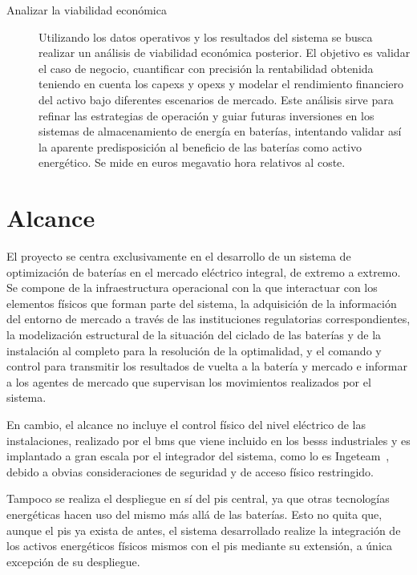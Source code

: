 \begin{description}
  \item[Analizar la viabilidad económica] Utilizando los datos operativos y los resultados del sistema se busca realizar un análisis de viabilidad económica posterior. El objetivo es validar el caso de negocio, cuantificar con precisión la rentabilidad obtenida teniendo en cuenta los \glspl{capex} y \glspl{opex} y modelar el rendimiento financiero del activo bajo diferentes escenarios de mercado. Este análisis sirve para refinar las estrategias de operación y guiar futuras inversiones en los sistemas de almacenamiento de energía en baterías, intentando validar así la aparente predisposición al beneficio de las baterías como activo energético. Se mide en euros megavatio hora relativos al coste.

\end{description}

\section{Alcance}%
\label{makereference1.2}

El proyecto se centra exclusivamente en el desarrollo de un sistema de optimización de baterías en el mercado eléctrico integral, de extremo a extremo. Se compone de la infraestructura operacional con la que interactuar con los elementos físicos que forman parte del sistema, la adquisición de la información del entorno de mercado a través de las instituciones regulatorias correspondientes, la modelización estructural de la situación del ciclado de las baterías y de la instalación al completo para la resolución de la optimalidad, y el comando y control para transmitir los resultados de vuelta a la batería y mercado e informar a los agentes de mercado que supervisan los movimientos realizados por el sistema.

En cambio, el alcance no incluye el control físico del nivel eléctrico de las instalaciones, realizado por el \gls{bms} que viene incluido en los \glspl{bess} industriales y es implantado a gran escala por el integrador del sistema, como lo es Ingeteam~\cite{ingeteam2022ingeteam}, debido a obvias consideraciones de seguridad y de acceso físico restringido.

Tampoco se realiza el despliegue en sí del \gls{pis} central, ya que otras tecnologías energéticas hacen uso del mismo más allá de las baterías. Esto no quita que, aunque el \gls{pis} ya exista de antes, el sistema desarrollado realize la integración de los activos energéticos físicos mismos con el \gls{pis} mediante su extensión, a única excepción de su despliegue.

